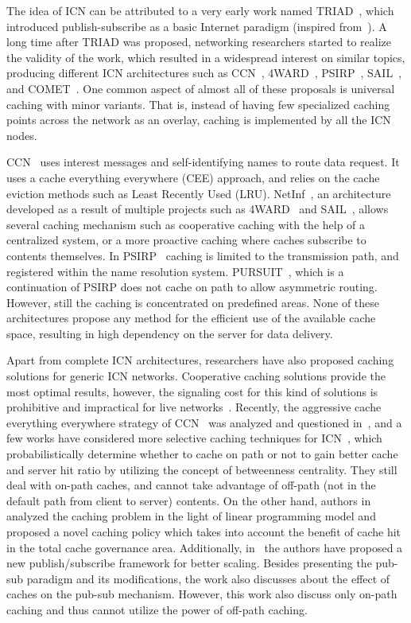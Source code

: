 \documentclass[article]{elsarticle}
\begin{document}
The idea of ICN can be attributed to a very early work named TRIAD~\cite{triad}, which introduced publish-subscribe as a basic Internet paradigm (inspired from~\cite{oldpubsub}). A long time after TRIAD was proposed, networking researchers started to realize the validity of the work, which resulted in a widespread interest on similar topics, producing different ICN architectures such as CCN~\cite{ccn}, 4WARD~\cite{4ward, 4ward2, 4ward3}, PSIRP~\cite{psirp, psirp2, psirp3, psirp4}, SAIL~\cite{sail, sail2}, and COMET~\cite{comet, comet2, comet3}. One common aspect of almost all of these proposals is universal caching with minor variants. That is, instead of having few specialized caching points across the network as an overlay, caching is implemented by all the ICN nodes. 

CCN~\cite{ccn} uses interest messages and self-identifying names to route data request. It uses a cache everything everywhere (CEE) approach, and relies on the cache eviction methods such as Least Recently Used (LRU). NetInf~\cite{netinf}, an architecture developed as a result of multiple projects such as 4WARD~\cite{4ward, 4ward2, 4ward3} and SAIL~\cite{sail}, allows several caching mechanism such as cooperative caching with the help of a centralized system, or a more proactive caching where caches subscribe to contents themselves. In PSIRP~\cite{psirp, psirp2, psirp4} caching is limited to the transmission path, and registered within the name resolution system. PURSUIT~\cite{psirp3}, which is a continuation of PSIRP does not cache on path to allow asymmetric routing. However, still the caching is concentrated on predefined areas. None of these architectures propose any method for the efficient use of the available cache space, resulting in high dependency on the server for data delivery.

Apart from complete ICN architectures, researchers have also proposed caching solutions for generic ICN networks. Cooperative caching solutions provide the most optimal results, however, the signaling cost for this kind of solutions is prohibitive and impractical for live networks~\cite{cache_coop, fayazbakhsh2013less}. Recently, the aggressive cache everything everywhere strategy of CCN~\cite{ccn} was analyzed and questioned in~\cite{hotnets2011}, and a few works have considered more selective caching techniques for ICN~\cite{psarasprobabilistic, chai2012cacheless}, which probabilistically determine whether to cache on path or not to gain better cache and server hit ratio by utilizing the concept of betweenness centrality. They still deal with on-path caches, and cannot take advantage of off-path (not in the default path from client to server) contents. On the other hand, authors in~\cite{wang2011could} analyzed the caching problem in the light of linear programming model and proposed a novel caching policy which takes into account the benefit of cache hit in the total cache governance area. Additionally, in~\cite{diallo2013} the authors have proposed a new publish/subscribe framework for better scaling. Besides presenting the pub-sub paradigm and its modifications, the work also discusses about the effect of caches on the pub-sub mechanism. However, this work also discuss only on-path caching and thus cannot utilize the power of off-path caching. 
\end{document}
